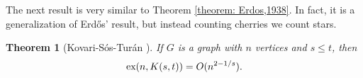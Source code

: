 \documentclass[12pt,twoside,a4paper,bibliography=totocnumbered]{book}
\numberwithin{equation}{section}
\newtheorem{theorem}             {Theorem}[section]
\newtheorem{corollary}	[theorem] {Corollary}
\theoremstyle{remark}
\def\ex{\mathop{\text{\rm ex}}\nolimits}
\begin{document}



The next result is very similar to Theorem \ref{theorem: Erdos,1938}. In fact, it is a generalization of Erd\H{o}s' result, but instead counting cherries we count stars.
\begin{theorem}[{Kovari-Sós-Turán \cite{KoSoTu54}}]
If $G$ is a graph with $n$ vertices and $s \leq t$, then
$$ \ex(n, K(s,t)) = O (n^{2 - 1/s}). $$
\end{theorem}
\end{document}
